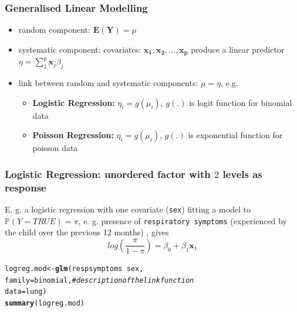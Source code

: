 \documentclass{beamer}\usepackage[]{graphicx}\usepackage[]{color}
\makeatletter
\newcommand{\hlcom}[1]{\textcolor[rgb]{0.678,0.584,0.686}{\textit{#1}}}%
\newcommand{\hlopt}[1]{\textcolor[rgb]{0,0,0}{#1}}%
\newcommand{\hlstd}[1]{\textcolor[rgb]{0.345,0.345,0.345}{#1}}%
\newcommand{\hlkwb}[1]{\textcolor[rgb]{0.69,0.353,0.396}{#1}}%
\newcommand{\hlkwc}[1]{\textcolor[rgb]{0.333,0.667,0.333}{#1}}%
\newcommand{\hlkwd}[1]{\textcolor[rgb]{0.737,0.353,0.396}{\textbf{#1}}}%
\newenvironment{kframe}{%
 \def\at@end@of@kframe{}%
 \ifinner\ifhmode%
  \def\at@end@of@kframe{\end{minipage}}%
  \begin{minipage}{\columnwidth}%
 \fi\fi%
 \def\FrameCommand##1{\hskip\@totalleftmargin \hskip-\fboxsep
 \colorbox{shadecolor}{##1}\hskip-\fboxsep
     \hskip-\linewidth \hskip-\@totalleftmargin \hskip\columnwidth}%
 \MakeFramed {\advance\hsize-\width
   \@totalleftmargin\z@ \linewidth\hsize
   \@setminipage}}%
 {\par\unskip\endMakeFramed%
 \at@end@of@kframe}
\newenvironment{knitrout}{}{} %
\makeatother
\begin{document}
{{{%

\usebackgroundtemplate{}
\begin{frame}
\frametitle{Generalised Linear Modelling}
\begin{itemize}
\setlength\itemsep{1.5em}
\item random component: $\mathbf{E(Y)} = \mu$
\item systematic component: covariates: $\mathbf{x_1,x_2,\dots,x_p}$ produce a linear predictor $\eta = \sum^p_1\mathbf{x}_j \beta_j$ 
\item link between random and systematic components: $\mu = \eta$, e.g.
\begin{itemize}
\item \textbf{Logistic Regression:} \newline
$\eta_i=g(\mu_i)$, $g(.)$ is logit function for binomial data
\item \textbf{Poisson Regression:} \newline
$\eta_i=g(\mu_i)$, $g(.)$ is exponential function for poisson data
\end{itemize} 
\end{itemize} 
\end{frame}

\begin{frame}[fragile]
\frametitle{Logistic Regression: unordered factor with $2$ levels as response}
E. g. a logistic regression with one covariate (\texttt{sex}) fitting a model
to $\mathbb{P}(Y=TRUE)=\pi$, e. g. presence of \texttt{respiratory symptoms}
(experienced by the child over the previous 12 months) , gives
\begin{equation}
log\left(\frac{\pi}{1-\pi}\right)=\beta_0+\beta_1\mathbf{x}_1 \nonumber
\end{equation}
\begin{knitrout}\scriptsize
{}\color{fgcolor}\begin{kframe}
\begin{alltt}
\hlstd{logreg.mod} \hlkwb{<-} \hlkwd{glm}\hlstd{(respsymptoms} \hlopt{~} \hlstd{sex,}
               \hlkwc{family} \hlstd{= binomial,} \hlcom{# description of the link function}
               \hlkwc{data} \hlstd{= lung)}
\hlkwd{summary}\hlstd{(logreg.mod)}
\end{alltt}
\end{kframe}
\end{knitrout}
\end{frame}

}}}
\end{document}
